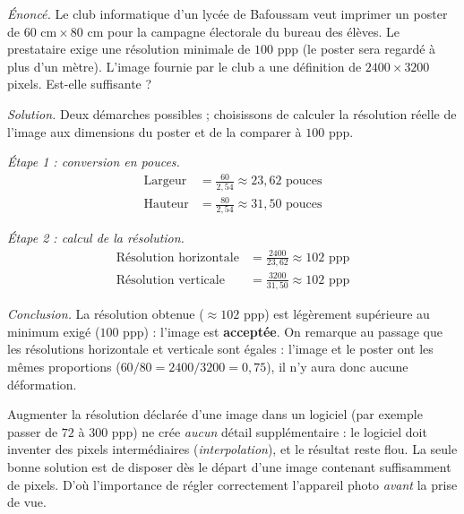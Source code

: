\documentclass[11pt]{article}
\newcounter{popsec}
\newcounter{popsub}
\newcommand{\courssub}[1]{%
  \stepcounter{popsub}%
  \par\vspace{9pt}\noindent{\popxbold\fontsize{11.5}{13}\selectfont\color{popink}{\color{poporange}\thepopsec.\thepopsub}\hspace{6pt}#1}\par\nopagebreak\vspace{4pt}
}
\begin{document}
\begin{exoresolu}
\emph{Énoncé.} Le club informatique d'un lycée de Bafoussam veut imprimer un poster de $60 \text{ cm} \times 80 \text{ cm}$ pour la campagne électorale du bureau des élèves. Le prestataire exige une résolution minimale de $100$ ppp (le poster sera regardé à plus d'un mètre). L'image fournie par le club a une définition de $2400 \times 3200$ pixels. Est-elle suffisante ?

\tcblower
\emph{Solution.} Deux démarches possibles ; choisissons de calculer la résolution réelle de l'image aux dimensions du poster et de la comparer à $100$ ppp.

\emph{Étape 1 : conversion en pouces.}
\begin{align*}
\text{Largeur} &= \frac{60}{2{,}54} \approx 23{,}62 \text{ pouces} \\
\text{Hauteur} &= \frac{80}{2{,}54} \approx 31{,}50 \text{ pouces}
\end{align*}

\emph{Étape 2 : calcul de la résolution.}
\begin{align*}
\text{Résolution horizontale} &= \frac{2400}{23{,}62} \approx 102 \text{ ppp} \\
\text{Résolution verticale} &= \frac{3200}{31{,}50} \approx 102 \text{ ppp}
\end{align*}

\emph{Conclusion.} La résolution obtenue ($\approx 102$ ppp) est légèrement supérieure au minimum exigé ($100$ ppp) : l'image est \textbf{acceptée}. On remarque au passage que les résolutions horizontale et verticale sont égales : l'image et le poster ont les mêmes proportions ($60/80 = 2400/3200 = 0{,}75$), il n'y aura donc aucune déformation.
\end{exoresolu}

\begin{attention}
Augmenter la résolution déclarée d'une image dans un logiciel (par exemple passer de $72$ à $300$ ppp) ne crée \emph{aucun} détail supplémentaire : le logiciel doit inventer des pixels intermédiaires (\emph{interpolation}), et le résultat reste flou. La seule bonne solution est de disposer dès le départ d'une image contenant suffisamment de pixels. D'où l'importance de régler correctement l'appareil photo \emph{avant} la prise de vue.
\end{attention}

\courssub{Synthèse de la section}
\end{document}
